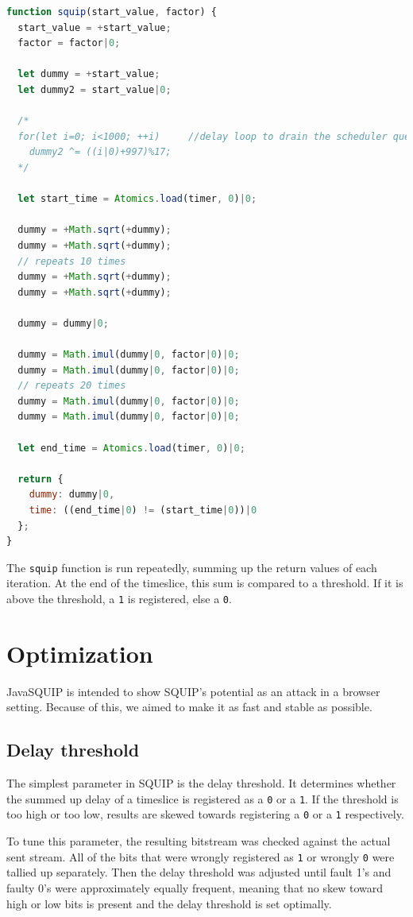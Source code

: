 \documentclass[11pt,
  titlepage=false,
]{scrreprt}
\begin{document}
\begin{lstlisting}[language=JavaScript]
    function squip(start_value, factor) {
  start_value = +start_value;
  factor = factor|0;

  let dummy = +start_value;
  let dummy2 = start_value|0;

  /*
  for(let i=0; i<1000; ++i)     //delay loop to drain the scheduler queue
    dummy2 ^= ((i|0)+997)%17;
  */

  let start_time = Atomics.load(timer, 0)|0;

  dummy = +Math.sqrt(+dummy);
  dummy = +Math.sqrt(+dummy);
  // repeats 10 times
  dummy = +Math.sqrt(+dummy);
  dummy = +Math.sqrt(+dummy);

  dummy = dummy|0;

  dummy = Math.imul(dummy|0, factor|0)|0;
  dummy = Math.imul(dummy|0, factor|0)|0;
  // repeats 20 times
  dummy = Math.imul(dummy|0, factor|0)|0;
  dummy = Math.imul(dummy|0, factor|0)|0;

  let end_time = Atomics.load(timer, 0)|0;

  return {
    dummy: dummy|0,
    time: ((end_time|0) != (start_time|0))|0
  };
}
\end{lstlisting}

The \texttt{squip} function is run repeatedly, summing up the return values of each iteration.
At the end of the timeslice, this sum is compared to a threshold.
If it is above the threshold, a \texttt{1} is registered, else a \texttt{0}.

\section{Optimization}
JavaSQUIP is intended to show SQUIP's potential as an attack in a browser setting.
Because of this, we aimed to make it as fast and stable as possible.

\subsection{Delay threshold}
The simplest parameter in SQUIP is the delay threshold.
It determines whether the summed up delay of a timeslice is registered as a \texttt{0} or a \texttt{1}.
If the threshold is too high or too low, results are skewed towards registering a \texttt{0} or a \texttt{1} respectively.

To tune this parameter, the resulting bitstream was checked against the actual sent stream.
All of the bits that were wrongly registered as \texttt{1} or wrongly \texttt{0} were tallied up separately.
Then the delay threshold was adjusted until fault 1's and faulty 0's were approximately equally frequent,
meaning that no skew toward high or low bits is present and the delay threshold is set optimally.
\end{document}
